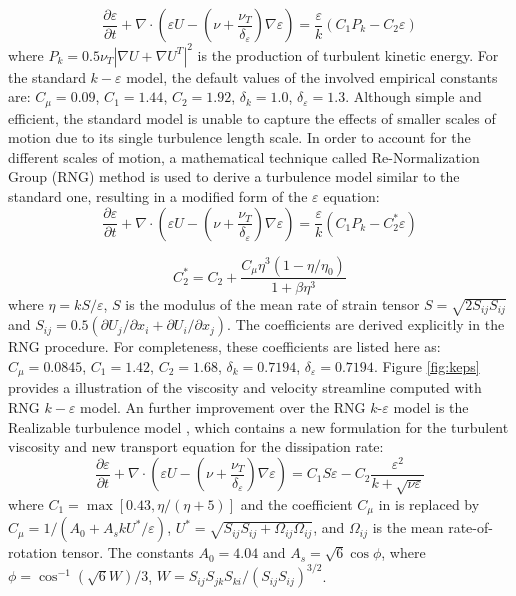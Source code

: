 \begin{equation} \frac{\partial
\varepsilon}{\partial t}+\nabla\cdot(\varepsilon U
-(\nu+\frac{\nu_T}{\delta_\varepsilon})\nabla \varepsilon)
=\frac{\varepsilon}{k}(C_1P_k-C_2\varepsilon) \label{eq:eps} 
\end{equation}
where $P_k = 0.5\nu_T|\nabla U + \nabla U^T|^2$ is the production of
turbulent kinetic energy. For the standard $k-\varepsilon$ model, the default
values of the involved empirical constants are: $C_\mu = 0.09$, $C_1 = 1.44$,
$C_2=1.92$, $\delta_k=1.0$, $\delta_{\varepsilon}=1.3$.  Although simple and
efficient, the standard model is unable to capture the effects of smaller scales
of motion due to its single turbulence length scale.  In order to account for
the different scales of motion, a mathematical technique called Re-Normalization
Group (RNG) method \cite{Yakhot1986Renormalization} is used to derive a
turbulence model similar to the standard one, resulting in a modified form of
the $\varepsilon$ equation: 
\begin{equation} 
\frac{\partial
\varepsilon}{\partial t}+\nabla\cdot(\varepsilon U
-(\nu+\frac{\nu_T}{\delta_\varepsilon})\nabla \varepsilon)
=\frac{\varepsilon}{k}(C_1P_k-C^*_2\varepsilon) \label{eq:RNG} 
\end{equation}

\begin{equation} 
C^*_2=C_2+\frac{C_{\mu}\eta^3(1-\eta/\eta_0)}{1+\beta\eta^3}
\end{equation} 
where $\eta = kS/\varepsilon$, $S$ is the modulus of the mean rate of
strain tensor $S = \sqrt{2S_{ij}S_{ij}}$ and 
$S_{ij} = 0.5(\partial U_j/\partial x_i + \partial U_i/\partial x_j)$.  
The coefficients are derived explicitly in the RNG procedure.
For completeness, these coefficients are listed here as: $C_\mu = 0.0845$, $C_1 = 1.42$, $C_2=1.68$,
$\delta_k=0.7194$, $\delta_{\varepsilon}=0.7194$. Figure \ref{fig:keps} provides 
a illustration of the viscosity and velocity streamline computed with RNG $k-\varepsilon$ model.
An further improvement over the RNG $k$-$\varepsilon$ model is the Realizable turbulence model \cite{shih1995new}, which contains a new formulation for the turbulent viscosity and new transport equation for the dissipation rate:
\begin{equation}
\frac{\partial
\varepsilon}{\partial t}+\nabla\cdot(\varepsilon U
-(\nu+\frac{\nu_T}{\delta_\varepsilon})\nabla \varepsilon)
=C_1S\varepsilon - C_2\frac{\varepsilon^2}{k + \sqrt{\nu \varepsilon}} \label{eq:REAL} 
\end{equation} 
where $C_1 = \max [0.43, \eta/(\eta + 5)]$ and the coefficient $C_{\mu}$ in  is replaced by
$C_{\mu} = 1/(A_0 + A_skU^*/\varepsilon)$, $U^* = \sqrt{S_{ij}S_{ij} + \Omega_{ij}\Omega_{ij}}$, 
and $\Omega_{ij}$ is the mean rate-of-rotation tensor. The constants $A_0 = 4.04$ and 
$A_s = \sqrt{6}\cos\phi$, where $\phi = \cos^{-1}(\sqrt{6}W)/3$, $W = S_{ij}S_{jk}S_{ki}/(S_{ij}S_{ij})^{3/2}$.
 
